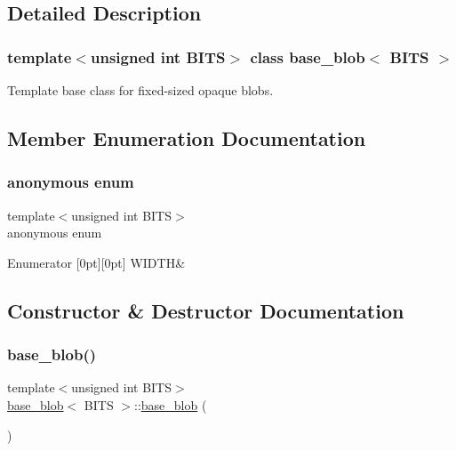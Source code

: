 \subsection{Detailed Description}
\subsubsection*{template$<$unsigned int B\+I\+TS$>$\newline
class base\+\_\+blob$<$ B\+I\+T\+S $>$}

Template base class for fixed-\/sized opaque blobs. 

\subsection{Member Enumeration Documentation}
\mbox{\label{classbase__blob_a712871e6425fe0509412c650c8a28262}} 
\subsubsection{\texorpdfstring{anonymous enum}{anonymous enum}}
{\footnotesize\ttfamily template$<$unsigned int B\+I\+TS$>$ \\
anonymous enum\hspace{0.3cm}{\ttfamily [protected]}}

\begin{DoxyEnumFields}{Enumerator}
[0pt][0pt]{}\mbox{\label{classbase__blob_a712871e6425fe0509412c650c8a28262a3e53605ecb8eb4c497cb23476695f0c3}} 
W\+I\+D\+TH&\\
\hline

\end{DoxyEnumFields}


\subsection{Constructor \& Destructor Documentation}
\mbox{\label{classbase__blob_ada7be83089951dc9438f384c0587cf29}} 
\subsubsection{\texorpdfstring{base\+\_\+blob()}{base\_blob()}\hspace{0.1cm}{\footnotesize\ttfamily [1/2]}}
{\footnotesize\ttfamily template$<$unsigned int B\+I\+TS$>$ \\
\mbox{\hyperlink{classbase__blob}{base\+\_\+blob}}$<$ B\+I\+TS $>$\+::\mbox{\hyperlink{classbase__blob}{base\+\_\+blob}} (\begin{DoxyParamCaption}{ }\end{DoxyParamCaption})\hspace{0.3cm}{\ttfamily [inline]}}

